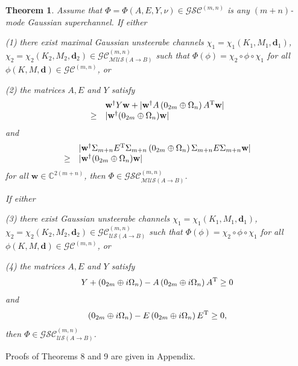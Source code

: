 \documentclass[10pt,aps,pra,amsfonts,amssymb,amsmath,%
floatfix,nofootinbib, groupedaddress,superscriptaddress,citesort,twocolumn
]{revtex4}%
\newtheorem{theorem}{Theorem}
\begin{document}
\begin{theorem}  \label{TH501}
	Assume that $\Phi=\Phi \left( A,E,Y,\nu \right) \in  {\mathcal {GSC}}^{(m,n)} $ is  any $(m+n)$-mode  Gaussian superchannel.
If either 

(1) there exist maximal Gaussian unsteerabe channels $\chi_1=\chi_1( K_1, M_1,\mathbf d_1 )$, $\chi_2=\chi_2(K_2, M_2, \mathbf d_2 ) \in  {\mathcal {GC}}^{(m,n)}_{\mathcal {MUS}(A \rightarrow B)}$
	such that  $\Phi(\phi)= \chi_2 \circ \phi \circ \chi_1$ for all  $ \phi \left( {K,M,\mathbf d} \right) \in
\mathcal {GC}^{(m,n)}$, 
	or
	
	(2)	the matrices $A,E$ and $Y$ satisfy
	$$\begin{array}{rl}
		&\mathbf{w}^{\dag}Y\mathbf{w}+|\mathbf{w}^{\dag} A\left( 0_{2m}\oplus \Omega _n \right)A^{\rm T}\mathbf{w}| \\
		\ge&|\mathbf{w}^{\dag}( 0_{2m} \oplus \Omega _n )\mathbf{w}|
	\end{array}$$
	and
	$$\begin{array}{rl}
		&|\mathbf{w}^{\dag}\Sigma_{m+n}E^{\rm T} \Sigma_{m+n} \left( 0_{2m} \oplus \Omega _n\right)\Sigma_{m+n} E \Sigma_{m+n}\mathbf{w}| \\
		\ge&|\mathbf{w}^{\dag}( 0_{2m} \oplus \Omega_n ) \mathbf{w}|
	\end{array}	$$
	for all $\mathbf{w} \in \mathbb{C}^{2(m+n)}$,
then  $\Phi\in {\mathcal {GSC}}^{(m,n)}_{\mathcal {MUS}(A \rightarrow B)}$.
	
	If either
	
	(3)  there exist Gaussian unsteerabe channels $\chi_1=\chi_1( K_1, M_1,\mathbf d_1 )$, $\chi_2=\chi_2(K_2, M_2, \mathbf d_2 )\in {\mathcal {GC}}^{(m,n)}_{\mathcal {US}(A \rightarrow B)}$  such that  $\Phi(\phi)= \chi_2 \circ \phi \circ \chi_1$ for all  $ \phi \left( {K,M,\mathbf d} \right) \in \mathcal {GC}^{(m,n)}$, 
	or
	
	(4)	the matrices $A,E$ and $Y$ satisfy $$	Y + \left( 0_{2m} \oplus i\Omega _n \right) - A\left(0_{2m} \oplus i\Omega _n \right){A^{\rm T}} \ge 0$$	and
$$
		\left( 0_{2m} \oplus i\Omega_n \right) -
		E \left( 0_{2m} \oplus i\Omega _n\right)E^{\rm T} \ge 0,$$ then 
$\Phi\in {\mathcal {GSC}}^{(m,n)}_{\mathcal {US}(A \rightarrow B)}$.
\end{theorem}

Proofs of Theorems 8 and 9 are given in Appendix. 
\end{document}
